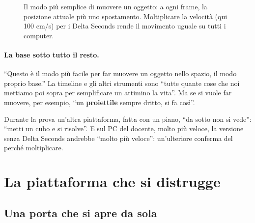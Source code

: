 \begin{figure}[htbp]
\centering
\begin{bpgraph}
\end{bpgraph}
\caption{Il modo più semplice di muovere un oggetto: a ogni frame, la posizione
attuale più uno spostamento. Moltiplicare la velocità (qui 100 cm/s) per i
Delta Seconds rende il movimento uguale su tutti i computer.}
\label{gd12:fig:tick}
\end{figure}

\paragraph{La base sotto tutto il resto.} ``Questo è il modo più facile per far
muovere un oggetto nello spazio, il modo proprio base.'' La timeline e gli altri
strumenti sono ``tutte quante cose che noi mettiamo poi sopra per semplificare
un attimino la vita''. Ma se si vuole far muovere, per esempio, ``un
\textbf{proiettile} sempre dritto, si fa così''.

Durante la prova un'altra piattaforma, fatta con un piano, ``da sotto non si
vede'': ``metti un cubo e si risolve''. E sul PC del docente, molto più veloce,
la versione senza Delta Seconds andrebbe ``molto più veloce'': un'ulteriore
conferma del perché moltiplicare.

\section{La piattaforma che si distrugge}
\label{gd12:sec:distrugge}

\subsection{Una porta che si apre da sola}

